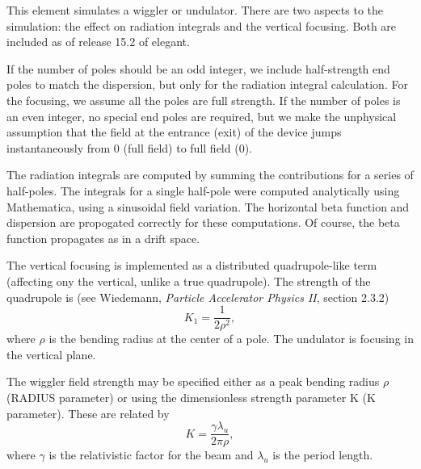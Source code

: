 This element simulates a wiggler or undulator.  There are two aspects
to the simulation: the effect on radiation integrals and the vertical
focusing.  Both are included as of release 15.2 of elegant.  

If the number of poles should be an odd integer, we include
half-strength end poles to match the dispersion, but only for the
radiation integral calculation.  For the focusing, we assume all the
poles are full strength.  If the number of poles is an even integer,
no special end poles are required, but we make the unphysical
assumption that the field at the entrance (exit) of the device jumps
instantaneously from 0 (full field) to full field (0).

The radiation integrals are computed by summing the contributions for
a series of half-poles.  The integrals for a single half-pole were
computed analytically using Mathematica, using a sinusoidal field
variation.  The horizontal beta function and dispersion are propogated
correctly for these computations.  Of course, the beta function
propagates as in a drift space.

The vertical focusing is implemented as a distributed quadrupole-like
term (affecting ony the vertical, unlike a true quadrupole).  The
strength of the quadrupole is (see Wiedemann, {\em Particle Accelerator
Physics II}, section 2.3.2)
\begin{equation}
K_1 = \frac{1}{2\rho^2},
\end{equation}
where $\rho$ is the bending radius at the center of a pole.  The
undulator is focusing in the vertical plane.

The wiggler field strength may be specified either as a peak bending 
radius $\rho$ (RADIUS parameter) or using the dimensionless strength parameter
K (K parameter).  These are related by
\begin{equation}
K = \frac{\gamma \lambda_u}{2 \pi \rho},
\end{equation}
where $\gamma$ is the relativistic factor for the beam and $\lambda_u$ is
the period length.

